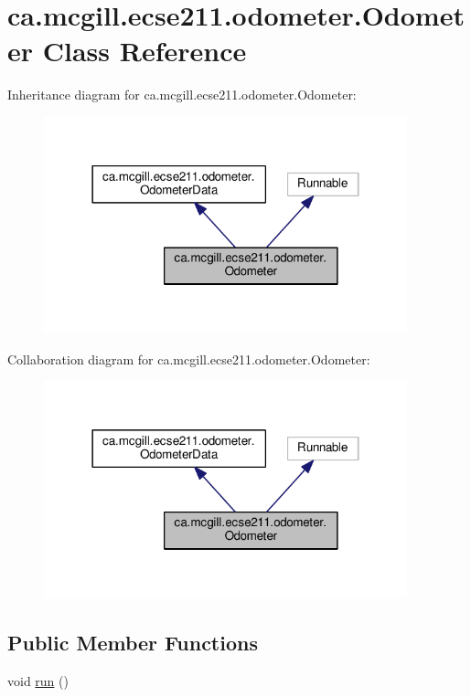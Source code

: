 \hypertarget{classca_1_1mcgill_1_1ecse211_1_1odometer_1_1_odometer}{}\section{ca.\+mcgill.\+ecse211.\+odometer.\+Odometer Class Reference}
\label{classca_1_1mcgill_1_1ecse211_1_1odometer_1_1_odometer}


Inheritance diagram for ca.\+mcgill.\+ecse211.\+odometer.\+Odometer\+:
\nopagebreak
\begin{figure}[H]
\begin{center}
\leavevmode
\includegraphics[width=298pt]{classca_1_1mcgill_1_1ecse211_1_1odometer_1_1_odometer__inherit__graph}
\end{center}
\end{figure}


Collaboration diagram for ca.\+mcgill.\+ecse211.\+odometer.\+Odometer\+:
\nopagebreak
\begin{figure}[H]
\begin{center}
\leavevmode
\includegraphics[width=298pt]{classca_1_1mcgill_1_1ecse211_1_1odometer_1_1_odometer__coll__graph}
\end{center}
\end{figure}
\subsection*{Public Member Functions}
\begin{DoxyCompactItemize}
\item 
void \hyperlink{classca_1_1mcgill_1_1ecse211_1_1odometer_1_1_odometer_af0ff4c5121973a8310cf986e25fa0d87}{run} ()
\end{DoxyCompactItemize}
